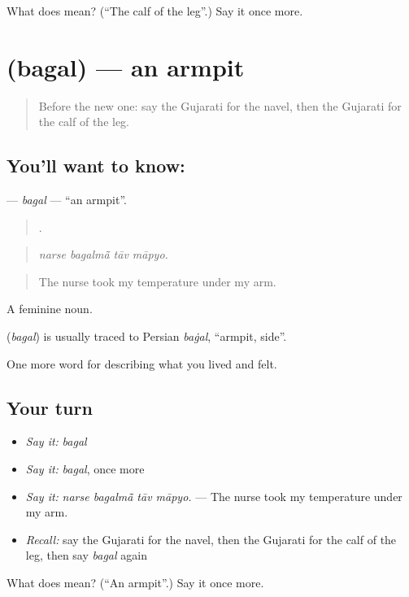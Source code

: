 \begin{tcolorbox}[breakable,colback=teal!4,colframe=teal!35!black,title={Before you move on}]
What does  mean? (\textquotedblleft{}The calf of the leg\textquotedblright{}.) Say it once more.
\end{tcolorbox}
\section[\texorpdfstring{\gu{બગલ} (bagal)}{બગલ (bagal)}]{ (bagal) — an armpit}

\label{lesson:GU-C473-bagal}



\begin{quote}
Before the new one: say the Gujarati for the navel, then the Gujarati for the calf of the leg.
\end{quote}

\subsection*{You'll want to know: }
\textbf{} — \emph{bagal} — \textquotedblleft{}an armpit\textquotedblright{}.

\begin{quote}
   .
\end{quote}

\begin{quote}
\emph{narse bagalmā̃ tāv māpyo.}
\end{quote}

\begin{quote}
The nurse took my temperature under my arm.
\end{quote}

A feminine noun.

\begin{cousinweb}
\textbf{} (\emph{bagal}) is usually traced to Persian \emph{baġal}, \textquotedblleft{}armpit, side\textquotedblright{}.
\end{cousinweb}

\begin{grammarlens}[title={What you've built}]
One more word for describing what you lived and felt.
\end{grammarlens}

\subsection*{Your turn}
\begin{itemize}
\raggedright
  \item \emph{Say it:} \emph{bagal}
  \item \emph{Say it:} \emph{bagal}, once more
  \item \emph{Say it:} \emph{narse bagalmā̃ tāv māpyo.} — The nurse took my temperature under my arm.
  \item \emph{Recall:} say the Gujarati for the navel, then the Gujarati for the calf of the leg, then say \emph{bagal} again
\end{itemize}

\begin{tcolorbox}[breakable,colback=teal!4,colframe=teal!35!black,title={Before you move on}]
What does  mean? (\textquotedblleft{}An armpit\textquotedblright{}.) Say it once more.
\end{tcolorbox}

